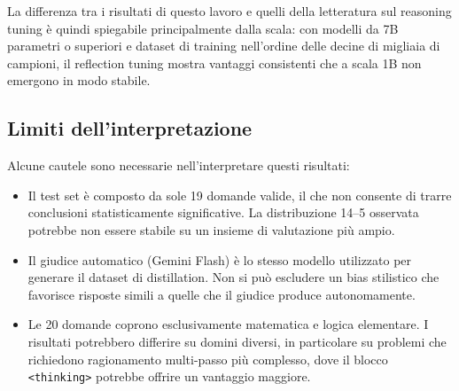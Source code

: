 La differenza tra i risultati di questo lavoro e quelli della
letteratura sul reasoning tuning è quindi spiegabile principalmente
dalla scala: con modelli da 7B parametri o superiori e dataset
di training nell'ordine delle decine di migliaia di campioni,
il reflection tuning mostra vantaggi consistenti che a scala 1B
non emergono in modo stabile.

\subsection{Limiti dell'interpretazione}

Alcune cautele sono necessarie nell'interpretare questi risultati:

\begin{itemize}
  \item Il test set è composto da sole 19 domande valide, il che
    non consente di trarre conclusioni statisticamente significative.
    La distribuzione 14--5 osservata potrebbe non essere stabile
    su un insieme di valutazione più ampio.

  \item Il giudice automatico (Gemini Flash) è lo stesso modello
    utilizzato per generare il dataset di distillation. Non si può
    escludere un bias stilistico che favorisce risposte simili a
    quelle che il giudice produce autonomamente.

  \item Le 20 domande coprono esclusivamente matematica e logica
    elementare. I risultati potrebbero differire su domini diversi,
    in particolare su problemi che richiedono ragionamento multi-passo
    più complesso, dove il blocco \texttt{<thinking>} potrebbe
    offrire un vantaggio maggiore.
\end{itemize}

